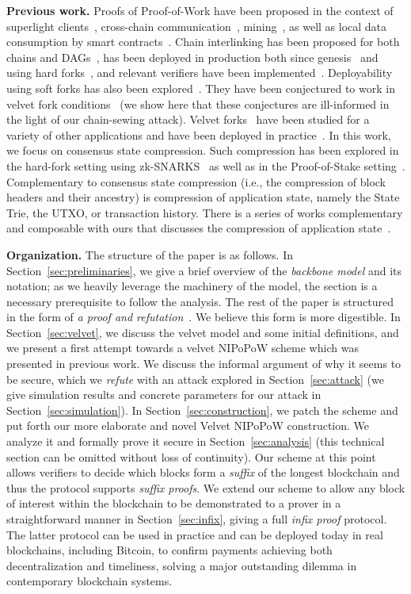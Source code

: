 \noindent
\textbf{Previous work.} Proofs of Proof-of-Work have been proposed in the
context of superlight clients~\cite{nipopows,flyclient},
cross-chain communication~\cite{pow-sidechains,burn,crosschain-sok},
mining~\cite{logspace}, as well as
local data consumption by smart contracts~\cite{derivatives}. Chain interlinking
has been proposed for both chains and DAGs~\cite{compactsuperblocks,flydag},
has been deployed in production both since genesis~\cite{ergo,nimiq} and using
hard forks~\cite{heartwood-flyclient}, and relevant verifiers have been
implemented~\cite{gglou,nipopow-gas}.
Deployability using soft forks has also been explored~\cite{soft-power}.
They have
been conjectured to work in velvet fork conditions~\cite{nipopows} (we show
here that these conjectures are ill-informed in the light of our chain-sewing
attack). Velvet forks~\cite{velvet} have been studied for a variety of other
applications and have been deployed in practice~\cite{gtklocker}. In this work,
we focus on consensus state compression. Such compression has been explored in
the hard-fork setting using zk-SNARKS~\cite{coda} as well as in the
Proof-of-Stake setting~\cite{pos-sidechains}. Complementary to consensus state
compression (i.e., the compression of block headers and their ancestry) is
compression of application state, namely the State Trie, the UTXO, or
transaction history. There is a series of works complementary and composable with ours that
discusses the compression of application state~\cite{edrax,ethanos,mimblewimble}.

\noindent
\textbf{Organization.}
The structure of the paper is as follows. In Section~\ref{sec:preliminaries}, we
give a brief overview of the \emph{backbone model} and its notation; as we
heavily leverage the machinery of the model, the section is a necessary
prerequisite to follow the analysis. The rest of the paper is structured in the
form of \emph{a proof and refutation}~\cite{lakatos}. We believe this form is
more digestible. In Section~\ref{sec:velvet}, we discuss the velvet model and
some initial definitions, and we present a first attempt towards a velvet
NIPoPoW scheme which was presented in previous work. We discuss the informal
argument of why it seems to be secure, which we \emph{refute} with an attack explored
in Section~\ref{sec:attack} (we give simulation results and concrete parameters
for our attack in Section~\ref{sec:simulation}). In Section~\ref{sec:construction}, we patch the
scheme and put forth our more elaborate and novel Velvet NIPoPoW construction.
We analyze it and formally prove it secure in Section~\ref{sec:analysis} (this
technical section can be omitted without loss of continuity). Our scheme at this
point allows verifiers to decide which blocks form a \emph{suffix} of the
longest blockchain and thus the protocol supports \emph{suffix proofs}. We
extend our scheme to allow any block of interest within the blockchain to be
demonstrated to a prover in a straightforward manner in
Section~\ref{sec:infix}, giving a full \emph{infix proof} protocol. The latter
protocol can be used in practice and can be deployed today in real blockchains,
including Bitcoin, to confirm payments achieving both decentralization and
timeliness, solving a major outstanding dilemma in contemporary blockchain
systems.
